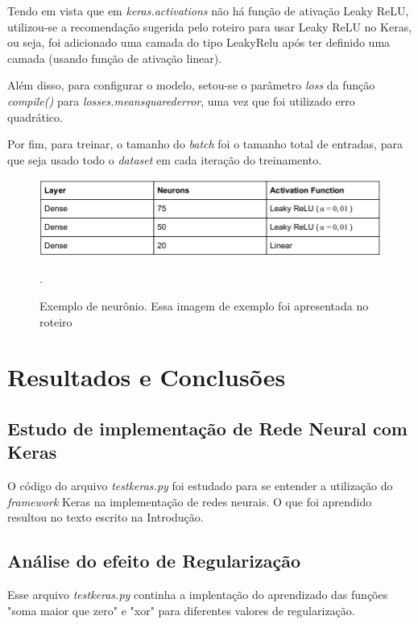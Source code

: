 \documentclass[conference]{IEEEtran}
\begin{document}
Tendo em vista que em \textit{keras.activations} não há função de ativação Leaky ReLU, utilizou-se a recomendação sugerida pelo roteiro \cite{roteiro} para usar Leaky ReLU no Keras, ou seja, foi adicionado uma camada do tipo LeakyRelu após ter definido uma camada (usando função de ativação linear).

Além disso, para configurar o modelo, setou-se o parâmetro \textit{loss} da função \textit{compile()} para \textit{losses.mean\underline{\space}squared\underline{\space}error}, uma vez que foi utilizado erro quadrático.

Por fim, para treinar, o tamanho do \textit{batch} foi o tamanho total de entradas, para que seja usado todo o \textit{dataset} em cada iteração do treinamento.

\begin{figure}[htbp]
\centering
\centerline{\includegraphics[scale=0.3]{imagens/arquitetura_rede_neural.png}}
\caption{Exemplo de neurônio. Essa imagem de exemplo foi apresentada no roteiro \cite{roteiro}}.
\label{arquitetura_rede_neural}
\end{figure}

\section{Resultados e Conclusões}

\subsection{Estudo de implementação de Rede Neural com Keras}
O código do arquivo \textit{test\underline{\space}keras.py} foi estudado para se entender a utilização do \textit{framework} Keras na implementação de redes neurais. O que foi aprendido resultou no texto escrito na Introdução.

\subsection{Análise do efeito de Regularização}
Esse arquivo \textit{test\underline{\space}keras.py} continha a implentação do aprendizado das funções "soma maior que zero" e "xor" para diferentes valores de regularização.
\end{document}
